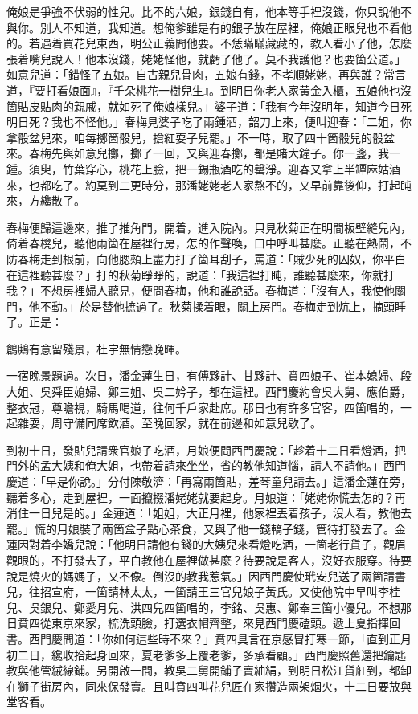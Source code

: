 俺娘是爭強不伏弱的性兒。比不的六娘，銀錢自有，他本等手裡沒錢，你只說他不與你。別人不知道，我知道。{}想俺爹雖是有的銀子放在屋裡，俺娘正眼兒也不看他的。若遇着買花兒東西，明公正義問他要。不恁瞞瞞藏藏的，教人看小了他，怎麼張着嘴兒說人！他本沒錢，姥姥怪他，就虧了他了。莫不我護他？也要箇公道。」{}如意兒道：「錯怪了五娘。自古親兒骨肉，五娘有錢，不孝順姥姥，再與誰？常言道，『要打看娘面』，『千朵桃花一樹兒生』。{}到明日你老人家黃金入櫃，五娘他也沒箇貼皮貼肉的親戚，就如死了俺娘樣兒。」婆子道：「我有今年沒明年，知道今日死明日死？我也不怪他。」春梅見婆子吃了兩鍾酒，韶刀上來，便叫迎春：「二姐，你拿骰盆兒來，咱每擲箇骰兒，搶紅耍子兒罷。」不一時，取了四十箇骰兒的骰盆來。春梅先與如意兒擲，擲了一回，又與迎春擲，都是賭大鐘子。你一盞，我一鍾。須臾，竹葉穿心，桃花上臉，把一錫瓶酒吃的罄淨。{}迎春又拿上半罈麻姑酒來，也都吃了。約莫到二更時分，那潘姥姥老人家熬不的，又早前靠後仰，打起盹來，方纔散了。

春梅便歸這邊來，推了推角門，開着，進入院內。只見秋菊正在明間板壁縫兒內，倚着春櫈兒，聽他兩箇在屋裡行房，怎的作聲喚，口中呼叫甚麼。正聽在熱鬧，不防春梅走到根前，向他腮頰上盡力打了箇耳刮子，罵道：「賊少死的囚奴，你平白在這裡聽甚麼？」打的秋菊睜睜的，說道：「我這裡打盹，誰聽甚麼來，你就打我？」不想房裡婦人聽見，便問春梅，他和誰說話。春梅道：「沒有人，我使他關門，他不動。」於是替他摭過了。秋菊揉着眼，關上房門。春梅走到炕上，摘頭睡了。正是：

\begin{myquote}
鶬鶊有意留殘景，杜宇無情戀晚暉。
\end{myquote}

一宿晚景題過。次日，潘金蓮生日，有傅夥計、甘夥計、賁四娘子、崔本媳婦、段大姐、吳舜臣媳婦、鄭三姐、吳二妗子，都在這裡。西門慶約會吳大舅、應伯爵，整衣冠，尊瞻視，騎馬喝道，往何千戶家赴席。那日也有許多官客，四箇唱的，一起雜耍，周守備同席飲酒。至晚回家，就在前邊和如意兒歇了。

到初十日，發貼兒請衆官娘子吃酒，月娘便問西門慶說：「趁着十二日看燈酒，把門外的孟大姨和俺大姐，也帶着請來坐坐，省的教他知道惱，請人不請他。」西門慶道：「早是你說。」分付陳敬濟：「再寫兩箇貼，差琴童兒請去。」這潘金蓮在旁，聽着多心，走到屋裡，一面攛掇潘姥姥就要起身。月娘道：「姥姥你慌去怎的？再消住一日兒是的。」金蓮道：「姐姐，大正月裡，他家裡丟着孩子，沒人看，教他去罷。」慌的月娘裝了兩箇盒子點心茶食，又與了他一錢轎子錢，管待打發去了。金蓮因對着李嬌兒說：「他明日請他有錢的大姨兒來看燈吃酒，一箇老行貨子，觀眉觀眼的，不打發去了，平白教他在屋裡做甚麼？待要說是客人，沒好衣服穿。待要說是燒火的媽媽子，又不像。倒沒的教我惹氣。」因西門慶使玳安兒送了兩箇請書兒，往招宣府，一箇請林太太，一箇請王三官兒娘子黃氏。又使他院中早叫李桂兒、吳銀兒、鄭愛月兒、洪四兒四箇唱的，李銘、吳惠、鄭奉三箇小優兒。不想那日賁四從東京來家，梳洗頭臉，打選衣帽齊整，來見西門慶磕頭。遞上夏指揮回書。西門慶問道：「你如何這些時不來？」賁四具言在京感冒打寒一節，「直到正月初二日，纔收拾起身回來，夏老爹多上覆老爹，多承看顧。」西門慶照舊還把鑰匙教與他管絨線鋪。另開啟一間，教吳二舅開鋪子賣紬絹，到明日松江貨舡到，都卸在獅子街房內，同來保發賣。且叫賁四叫花兒匠在家攢造兩架烟火，十二日要放與堂客看。

